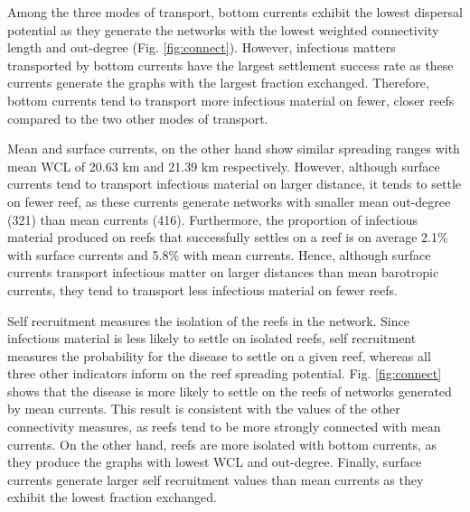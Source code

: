 \documentclass[utf8]{frontiersSCNS}
\begin{document}
Among the three modes of transport, bottom currents exhibit the lowest dispersal potential as they generate the networks with the lowest weighted connectivity length and out-degree (Fig. \ref{fig:connect}). However, infectious matters transported by bottom currents have the largest settlement success rate as these currents generate the graphs with the largest fraction exchanged. Therefore, bottom currents tend to transport more infectious material on fewer, closer reefs compared to the two other modes of transport.

Mean and surface currents, on the other hand show similar spreading ranges with mean WCL of 20.63 km and 21.39 km respectively. However, although surface currents tend to transport infectious material on larger distance, it tends to settle on fewer reef, as these currents generate networks with smaller mean out-degree (321) than mean currents (416). Furthermore, the proportion of infectious material produced on reefs that successfully settles on a reef is on average 2.1\% with surface currents and 5.8\% with mean currents. Hence, although surface currents transport infectious matter on larger distances than mean barotropic currents, they tend to  transport less infectious material on fewer reefs.

Self recruitment measures the isolation of the reefs in the network. Since infectious material is less likely to settle on isolated reefs, self recruitment measures the probability for the disease to settle on a given reef, whereas all three other indicators inform on the reef spreading potential. Fig. \ref{fig:connect} shows that the disease is more likely to settle on the reefs of networks generated by mean currents. This result is consistent with the values of the other connectivity measures, as reefs tend to be more strongly connected with mean currents. On the other hand, reefs are more isolated with bottom currents, as they produce the graphs with lowest WCL and out-degree. Finally, surface currents generate larger self recruitment values than mean currents as they exhibit the lowest fraction exchanged. 
\end{document}
